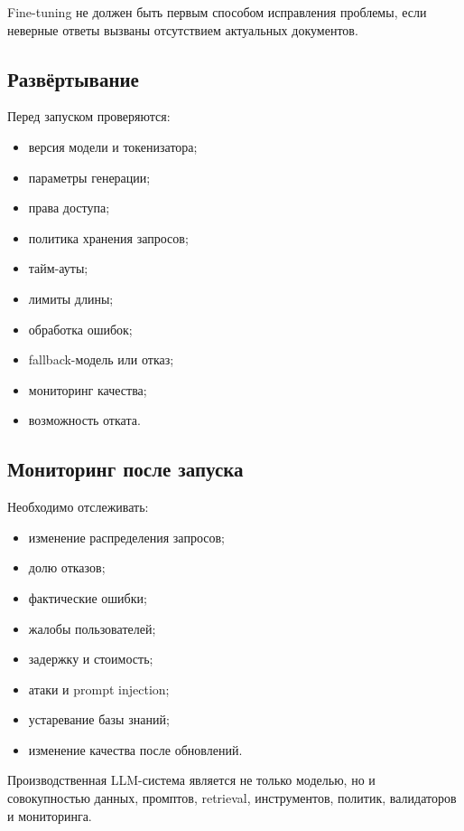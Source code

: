 \documentclass[12pt,a4paper]{article}
\newcommand{\1}{\mathbf{1}}
\theoremstyle{definition}
\theoremstyle{remark}
\begin{document}
Fine-tuning не должен быть первым способом исправления проблемы, если
неверные ответы вызваны отсутствием актуальных документов.

\subsection{Развёртывание}

Перед запуском проверяются:

\begin{itemize}
    \item версия модели и токенизатора;
    \item параметры генерации;
    \item права доступа;
    \item политика хранения запросов;
    \item тайм-ауты;
    \item лимиты длины;
    \item обработка ошибок;
    \item fallback-модель или отказ;
    \item мониторинг качества;
    \item возможность отката.
\end{itemize}

\subsection{Мониторинг после запуска}

Необходимо отслеживать:

\begin{itemize}
    \item изменение распределения запросов;
    \item долю отказов;
    \item фактические ошибки;
    \item жалобы пользователей;
    \item задержку и стоимость;
    \item атаки и prompt injection;
    \item устаревание базы знаний;
    \item изменение качества после обновлений.
\end{itemize}

Производственная LLM-система является не только моделью, но и
совокупностью данных, промптов, retrieval, инструментов, политик,
валидаторов и мониторинга.

\end{document}
